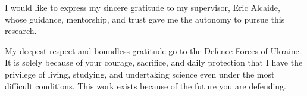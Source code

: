 \documentclass[
11pt, %
oneside, %
ukrainian,
english, %
singlespacing, %
headsepline, %
]{Thesis} %
\begin{document}

\begin{acknowledgements}
\addchaptertocentry{\acknowledgementname} %
\hspace*{\parindent}I would like to express my sincere gratitude to my supervisor, Eric Alcaide, whose guidance, mentorship, and trust gave me the autonomy to pursue this research.

My deepest respect and boundless gratitude go to the Defence Forces of Ukraine. It is solely because of your courage, sacrifice, and daily protection that I have the privilege of living, studying, and undertaking science even under the most difficult conditions. This work exists because of the future you are defending.

\end{acknowledgements}


\tableofcontents %

\listoffigures %

\listoftables %

\end{document}
